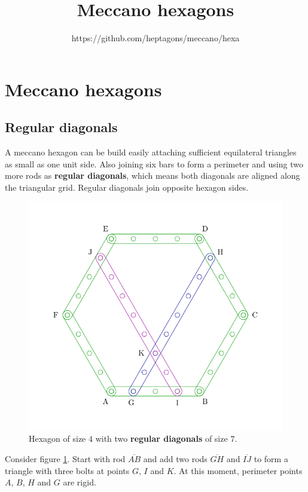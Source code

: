\documentclass[11pt]{article}
\title{\textbf{Meccano hexagons}}
\author{https://github.com/heptagons/meccano/hexa}
\date{}
\begin{document}
\maketitle

\section{Meccano hexagons}

\subsection {Regular diagonals}
A meccano hexagon can be build easily attaching sufficient equilateral
triangles as small as one unit side. 
Also joining six bars to form a perimeter and using two more rods as \textbf{regular diagonals},
which means both diagonals are aligned along the triangular grid.
Regular diagonals join opposite hexagon sides.

\begin{figure}[htpb]
\centering
\includegraphics[scale=0.75]{hexagon_simple}
\caption{Hexagon of size $4$ with two \textbf{regular diagonals} of size $7$.}
\label{fig:regular}
\end{figure}

Consider figure \ref{fig:regular}.
Start with rod $\overline{AB}$ and add two rods $\overline{GH}$ and
$\overline{IJ}$ to form a triangle with three bolts at points $G$, $I$ and $K$. At this moment, perimeter points $A$, $B$, $H$ and $G$ are rigid.
\end{document}

